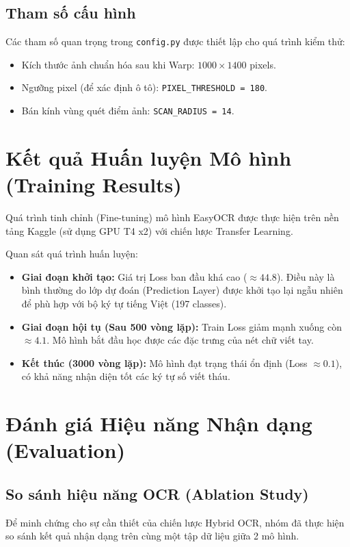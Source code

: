 \documentclass[6pt, a4paper]{report}
\begin{document}
	\subsection{Tham số cấu hình}
	Các tham số quan trọng trong \texttt{config.py} được thiết lập cho quá trình kiểm thử:
	\begin{itemize}
		\item Kích thước ảnh chuẩn hóa sau khi Warp: $1000 \times 1400$ pixels.
		\item Ngưỡng pixel (để xác định ô tô): \texttt{PIXEL\_THRESHOLD = 180}.
		\item Bán kính vùng quét điểm ảnh: \texttt{SCAN\_RADIUS = 14}.
	\end{itemize}
	
	\section{Kết quả Huấn luyện Mô hình (Training Results)}
	Quá trình tinh chỉnh (Fine-tuning) mô hình EasyOCR được thực hiện trên nền tảng Kaggle (sử dụng GPU T4 x2) với chiến lược Transfer Learning.
	
	Quan sát quá trình huấn luyện:
	\begin{itemize}
		\item \textbf{Giai đoạn khởi tạo:} Giá trị Loss ban đầu khá cao ($\approx 44.8$). Điều này là bình thường do lớp dự đoán (Prediction Layer) được khởi tạo lại ngẫu nhiên để phù hợp với bộ ký tự tiếng Việt (197 classes).
		\item \textbf{Giai đoạn hội tụ (Sau 500 vòng lặp):} Train Loss giảm mạnh xuống còn $\approx 4.1$. Mô hình bắt đầu học được các đặc trưng của nét chữ viết tay.
		\item \textbf{Kết thúc (3000 vòng lặp):} Mô hình đạt trạng thái ổn định (Loss $\approx 0.1$), có khả năng nhận diện tốt các ký tự số viết tháu.
	\end{itemize}
	
	\section{Đánh giá Hiệu năng Nhận dạng (Evaluation)}
	
	\subsection{So sánh hiệu năng OCR (Ablation Study)}
	Để minh chứng cho sự cần thiết của chiến lược Hybrid OCR, nhóm đã thực hiện so sánh kết quả nhận dạng trên cùng một tập dữ liệu giữa 2 mô hình.
	
\end{document}
